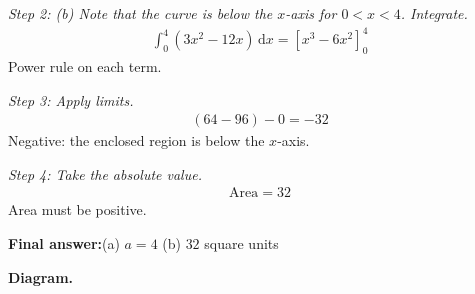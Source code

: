 \documentclass[11pt]{article}
\begin{document}
\textit{Step 2: (b) Note that the curve is below the \( x \)-axis for \( 0 < x < 4 \). Integrate.}
\[\begin{gathered}
\int_0^4 (3x^2 - 12x)\, \mathrm{d}x = \left[x^3 - 6x^2\right]_0^4
\end{gathered}\]
Power rule on each term.

\textit{Step 3: Apply limits.}
\[\begin{gathered}
(64 - 96) - 0 = -32
\end{gathered}\]
Negative: the enclosed region is below the \( x \)-axis.

\textit{Step 4: Take the absolute value.}
\[\begin{gathered}
\text{Area} = 32
\end{gathered}\]
Area must be positive.

\begin{answerbox}
\textbf{Final answer:}\quad (a) \(\displaystyle a = 4\)   (b) \(\displaystyle 32\) square units
\end{answerbox}
\textbf{Diagram.}
\end{document}
